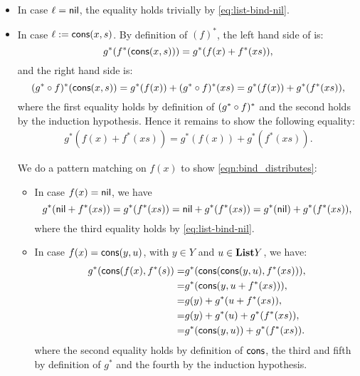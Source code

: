 \begin{solution}
\begin{enumerate}
\begin{itemize}
\item In case $\ell = \nil$, the equality holds trivially by \cref{eq:list-bind-nil}.

\item In case $\ell := \cons(x,s)$. By definition of $(f)^{*}$, the left hand side of is:
\[
g^{*}(f^{*}(\cons(x,s))) = g^{*}(f(x) + f^{*}(xs)),
\]
and the right hand side is:
\[
(\co{f}{g^{*}})^{*}(\cons(x,s)) = g^{*}(f(x)) + (\co{f}{g^{*}})^{*}(xs) = g^{*}(f(x)) + g^{*}(f^{*}(xs)),
\]
where the first equality holds by definition of $(\co{f}{g^{*}})^{*}$ and the second holds by the induction hypothesis. Hence it remains to show the following equality:
\begin{align}\label{eqn:bind_distributes}
g^{*}(f(x) + f^{*}(xs)) = g^{*}(f(x)) + g^{*}(f^{*}(xs)).
\end{align}

We do a pattern matching on $f(x)$ to show \cref{eqn:bind_distributes}:
\begin{itemize}
\item In case $f(x) = \nil$, we have
\[
g^{*}(\nil + f^{*}(xs)) = g^{*}(f^{*}(xs)) = \nil + g^{*}(f^{*}(xs)) = g^{*}(\nil) + g^{*}(f^{*}(xs)),
\]
where the third equality holds by \cref{eq:list-bind-nil}.
\item In case $f(x) = \cons(y,u)$, with $y\in Y$ and $u\in \List Y$, we have:
\begin{eqnarray*}
g^{*}(\cons(f(x),f^{*}(s)) =& g^{*}(\cons(\cons(y,u), f^{*}(xs))), \\
	=& g^{*}(\cons(y, u + f^{*}(xs))),\\
	=& g(y) + g^{*}(u + f^{*}(xs)),\\
	=& g(y) + g^{*}(u) + g^{*}(f^{*}(xs)),\\
	=& g^{*}(\cons(y,u)) + g^{*}(f^{*}(xs)).
\end{eqnarray*}
where the second equality holds by definition of $\cons$, the third and fifth by definition of $g^{*}$ and the fourth by the induction hypothesis.

\end{itemize}
\end{itemize}
\end{enumerate}
\end{solution}


